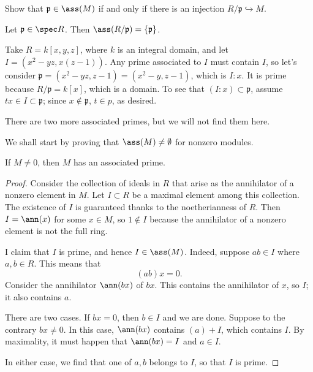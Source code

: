 \begin{exercise} 
Show that $\mathfrak{p} \in \ass(M)$ if and only if there is an injection
$R/\mathfrak{p} \hookrightarrow M$.
\end{exercise} 

\begin{exercise} 
Let $\mathfrak{p} \in \spec R$. Then $\ass(R/\mathfrak{p}) =
\left\{\mathfrak{p}\right\}$.
\end{exercise} 

\begin{example}
Take $R=k[x,y,z]$, where $k$ is an integral domain, and let $I = (x^2-yz,x(z-1))$. Any
 prime associated to $I$ must contain $I$, so let's consider
   $\mathfrak{p}=(x^2-yz,z-1)=(x^2-y,z-1)$, which is $I:x$. It is prime because $R/\mathfrak{p} = k[x]$,
   which is a domain. To see that $(I:x)\subset \mathfrak{p}$, assume $tx\in I\subset \mathfrak{p}$; since
   $x\not\in \mathfrak{p}$, $t\in p$, as desired.

   There are two more associated primes, but we will not find them here.
 \end{example}


We shall start by proving that $\ass(M) \neq \emptyset$ for nonzero modules. 
\begin{proposition} \label{assmnonempty} 
If $M \neq 0$, then $M$ has an associated prime.
\end{proposition} 
\begin{proof}  Consider the collection of ideals in $R$ that arise as the
annihilator of a nonzero element in $M$. 
Let $I \subset R$ be a maximal element among this collection.  The existence of $I$ is guaranteed thanks to the noetherianness of
$R$.
Then $I = \ann(x)$ for some $x \in M$, so  $1 \notin I$ because the annihilator of a nonzero element is not the full
ring.

I claim that
$I$ is prime,  and hence $I \in \ass(M)$.  
Indeed, suppose $ab \in I$ where $a,b \in R$. This means that
\[ (ab)x = 0.  \]
Consider the annihilator $\ann(bx)$ of $bx$. This contains the annihilator of $x$, so $I$;
it also contains $a$.

There are two cases. If $bx = 0$, then $ b \in I$ and we are done. Suppose to
the contrary $bx \neq 0$. In this case, $\ann(bx)$ contains $(a) + I$, which
 contains $I$. By maximality, it must happen that $\ann(bx) = I$ and $ a \in
 I$. 

 In either case, we find that one of $a,b $ belongs to $I$, so that $I$ is
 prime. 

\end{proof} 

